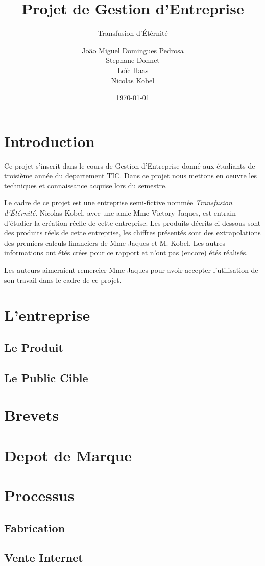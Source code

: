 \documentclass[10pt,a4paper]{article}
\title{Projet de Gestion d'Entreprise}
\subtitle{Transfusion d'Étérnité}
\author{João Miguel Domingues Pedrosa \\ Stephane Donnet \\ Loïc Haas \\ Nicolas Kobel}
\date{\today}
\begin{document}
\maketitle
\tableofcontents
\newpage
\section{Introduction}
Ce projet s'inscrit dans le cours de Gestion d'Entreprise donné aux étudiants de troisième année du departement TIC.
Dans ce projet nous mettons en oeuvre les techniques et connaissance acquise lors du semestre.

Le cadre de ce projet est une entreprise semi-fictive nommée \textit{Transfusion d'Étérnité}.
Nicolas Kobel, avec une amie Mme Victory Jaques, est entrain d'étudier la création réelle de cette entreprise.
Les produits décrits ci-dessous sont des produits réels de cette entreprise, les chiffres présentés sont des extrapolations des premiers calculs financiers de Mme Jaques et M. Kobel.
Les autres informations ont étés crées pour ce rapport et n'ont pas (encore) étés réalisés.

Les auteurs aimeraient remercier Mme Jaques pour avoir accepter l'utilisation de son travail dans le cadre de ce projet.
\section{L'entreprise}
\subsection{Le Produit}
\subsection{Le Public Cible}
\section{Brevets}
\section{Depot de Marque}
\section{Processus}
\subsection{Fabrication}
\subsection{Vente Internet}
\end{document}
